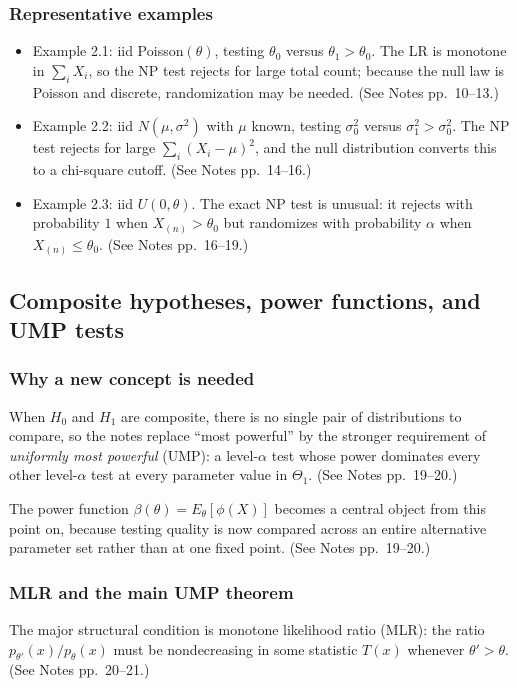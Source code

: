 \subsubsection{Representative examples}
\begin{itemize}
    \item Example 2.1: iid Poisson$(\theta)$, testing $\theta_0$ versus $\theta_1 > \theta_0$. The LR is monotone in $\sum_i X_i$, so the NP test rejects for large total count; because the null law is Poisson and discrete, randomization may be needed. (See Notes pp.~10--13.)
    \item Example 2.2: iid $N(\mu,\sigma^2)$ with $\mu$ known, testing $\sigma_0^2$ versus $\sigma_1^2 > \sigma_0^2$. The NP test rejects for large $\sum_i (X_i-\mu)^2$, and the null distribution converts this to a chi-square cutoff. (See Notes pp.~14--16.)
    \item Example 2.3: iid $U(0,\theta)$. The exact NP test is unusual: it rejects with probability $1$ when $X_{(n)} > \theta_0$ but randomizes with probability $\alpha$ when $X_{(n)} \le \theta_0$. (See Notes pp.~16--19.)
\end{itemize}

\subsection{Composite hypotheses, power functions, and UMP tests}
\subsubsection{Why a new concept is needed}
When $H_0$ and $H_1$ are composite, there is no single pair of distributions to compare, so the notes replace ``most powerful'' by the stronger requirement of \emph{uniformly most powerful} (UMP): a level-$\alpha$ test whose power dominates every other level-$\alpha$ test at every parameter value in $\Theta_1$. (See Notes pp.~19--20.)

The power function $\beta(\theta)=E_\theta[\phi(X)]$ becomes a central object from this point on, because testing quality is now compared across an entire alternative parameter set rather than at one fixed point. (See Notes pp.~19--20.)

\subsubsection{MLR and the main UMP theorem}
The major structural condition is monotone likelihood ratio (MLR): the ratio $p_{\theta'}(x)/p_{\theta}(x)$ must be nondecreasing in some statistic $T(x)$ whenever $\theta' > \theta$. (See Notes pp.~20--21.)


